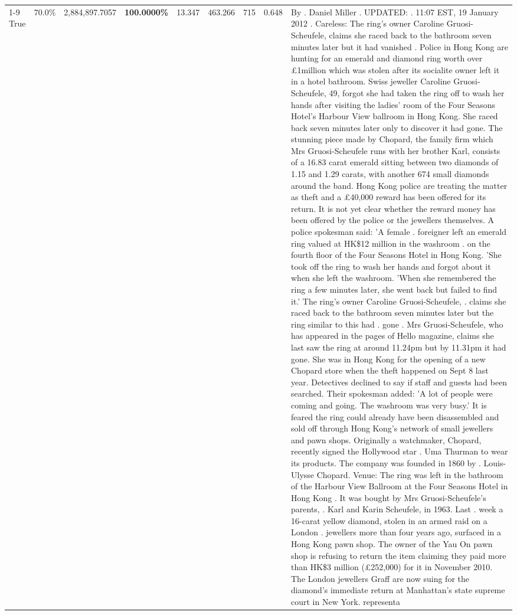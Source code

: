 \begin{table}[H]
\begin{tabular}{lllrlllll}
\cline{1-9}
True & 70.0\% & 2,884,897.7057 & \bfseries \color{red} 100.0000\% & 13.347 & 463.266 & 715 & 0.648 & By . Daniel Miller . UPDATED: . 11:07 EST, 19 January 2012 . Careless: The ring's owner Caroline Gruosi-Scheufele, claims she raced back to the bathroom seven minutes later but it had vanished . Police in Hong Kong are hunting for an emerald and diamond ring worth over £1million which was stolen after its socialite owner left it in a hotel bathroom. Swiss jeweller Caroline Gruosi-Scheufele, 49, forgot she had taken the ring off to wash her hands after visiting the ladies' room of the Four Seasons Hotel's Harbour View ballroom in Hong Kong. She raced back seven minutes later only to discover it had gone. The stunning piece made by Chopard, the family firm which Mrs Gruosi-Scheufele runs with her brother Karl, consists of a 16.83 carat emerald sitting between two diamonds of 1.15 and 1.29 carats, with another 674 small diamonds around the band. Hong Kong police are treating the matter as theft and a £40,000 reward has been offered for its return. It is not yet clear whether the reward money has been offered by the police or the jewellers themselves. A police spokesman said: 'A female . foreigner left an emerald ring valued at HK\$12 million in the washroom . on the fourth floor of the Four Seasons Hotel in Hong Kong. 'She took off the ring to wash her hands and forgot about it when she left the washroom. 'When she remembered the ring a few minutes later, she went back but failed to find it.' The ring's owner Caroline Gruosi-Scheufele, . claims she raced back to the bathroom seven minutes later but the ring similar to this had . gone . Mrs Gruosi-Scheufele, who has appeared in the pages of Hello magazine, claims she last saw the ring at around 11.24pm but by 11.31pm it had gone. She was in Hong Kong for the opening of a new Chopard store when the theft happened on Sept 8 last year. Detectives declined to say if staff and guests had been searched. Their spokesman added: 'A lot of people were coming and going. The washroom was very busy.' It is feared the ring could already have been disassembled and sold off through Hong Kong's network of small jewellers and pawn shops. Originally a watchmaker, Chopard, recently signed the Hollywood star . Uma Thurman to wear its products. The company was founded in 1860 by . Louis-Ulysse Chopard. Venue: The ring was left in the bathroom of the Harbour View Ballroom at the Four Seasons Hotel in Hong Kong . It was bought by Mrs Gruosi-Scheufele's  parents, . Karl and Karin Scheufele, in 1963. Last . week a 16-carat yellow diamond, stolen in an armed raid on a London . jewellers more than four years ago, surfaced in a Hong Kong pawn shop. The owner of the Yau On pawn shop is refusing to return the item claiming they paid more than HK\$3 million (£252,000) for it in November 2010. The London jewellers Graff are now suing for the diamond’s immediate return at Manhattan’s state supreme court in New York. representa \\

\end{tabular}
\end{table}
